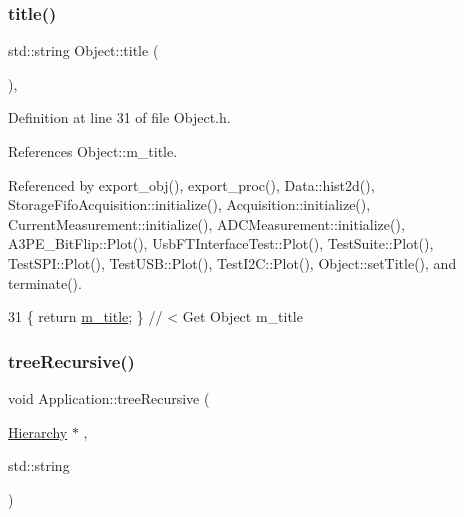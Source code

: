 \subsubsection{\texorpdfstring{title()}{title()}}
{\footnotesize\ttfamily std\+::string Object\+::title (\begin{DoxyParamCaption}{ }\end{DoxyParamCaption})\hspace{0.3cm}{\ttfamily [inline]}, {\ttfamily [inherited]}}



Definition at line 31 of file Object.\+h.



References Object\+::m\+\_\+title.



Referenced by export\+\_\+obj(), export\+\_\+proc(), Data\+::hist2d(), Storage\+Fifo\+Acquisition\+::initialize(), Acquisition\+::initialize(), Current\+Measurement\+::initialize(), A\+D\+C\+Measurement\+::initialize(), A3\+P\+E\+\_\+\+Bit\+Flip\+::\+Plot(), Usb\+F\+T\+Interface\+Test\+::\+Plot(), Test\+Suite\+::\+Plot(), Test\+S\+P\+I\+::\+Plot(), Test\+U\+S\+B\+::\+Plot(), Test\+I2\+C\+::\+Plot(), Object\+::set\+Title(), and terminate().


\begin{DoxyCode}
31 \{ \textcolor{keywordflow}{return} \hyperlink{classObject_affbeea1953eb5163573b92fad8f75727}{m\_title};      \} \textcolor{comment}{// < Get Object m\_title}
\end{DoxyCode}
\mbox{\label{classApplication_ab4a53c51303b155b738970bec9a6ce89}} 
\subsubsection{\texorpdfstring{tree\+Recursive()}{treeRecursive()}}
{\footnotesize\ttfamily void Application\+::tree\+Recursive (\begin{DoxyParamCaption}\item[{\hyperlink{classHierarchy}{Hierarchy} $\ast$}]{,  }\item[{std\+::string}]{ }\end{DoxyParamCaption})}

\mbox{\label{classObject_a84f99f70f144a83e1582d1d0f84e4e62}} 
